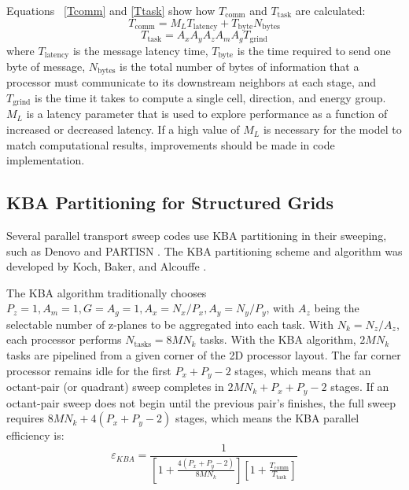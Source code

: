 \documentclass[11pt, letterpaper,titlepage,oneside]{article}
\begin{document}
Equations ~\eqref{Tcomm} and \ref{Ttask} show how $T_{\text{comm}}$ and $T_{\text{task}}$ are calculated:
\begin{equation}
T_{\text{comm}} = M_L T_{\text{latency}} + T_{\text{byte}} N_{\text{bytes}}
\label{Tcomm}
\end{equation}
\begin{equation}
T_{\text{task}} = A_x A_y A_z A_m A_g T_{\text{grind}}
\label{Ttask}
\end{equation}
where $T_{\text{latency}}$ is the message latency time, $T_{\text{byte}}$ is the time required to send one byte of message, $N_{\text{bytes}}$ is the total number of bytes of information that a processor must communicate to its downstream neighbors at each stage, and $T_{\text{grind}}$ is the time it takes to compute a single cell, direction, and energy group. $M_L$ is a latency parameter that is used to explore performance as a function of increased or decreased latency. If a high value of $M_L$ is necessary for the model to match computational results, improvements should be made in code implementation.

\subsection{KBA Partitioning for Structured Grids}

Several parallel transport sweep codes use KBA partitioning in their sweeping, such as Denovo \cite{denovo} and PARTISN \cite{partisn}. The KBA partitioning scheme and algorithm was developed by Koch, Baker, and Alcouffe \cite{partisn}.

The KBA algorithm traditionally chooses $P_z = 1, A_m = 1, G = A_g = 1, A_x = N_x/P_x, A_y = N_y/P_y$, with $A_z$ being the selectable number of z-planes to be aggregated into each task. With $N_k = N_z/A_z$, each processor performs $N_{\text{tasks}} = 8MN_k$ tasks. With the KBA algorithm, $2MN_k$ tasks are pipelined from a given corner of the 2D processor layout. The far corner processor remains idle for the first $P_x + P_y - 2 $ stages, which means that an octant-pair (or quadrant) sweep completes in $2MN_k + P_x + P_y - 2$ stages. If an octant-pair sweep does not begin until the previous pair's finishes, the full sweep requires $8MN_k + 4(P_x+P_y-2)$ stages, which means the KBA parallel efficiency is:
\begin{equation}
\varepsilon_{KBA} = \frac{1}{[1+\frac{4(P_x+P_y-2)}{8MN_k}][1+\frac{T_{\text{comm}}}{T_{\text{task}}}]}
\label{eKBA}
\end{equation}
\end{document}
